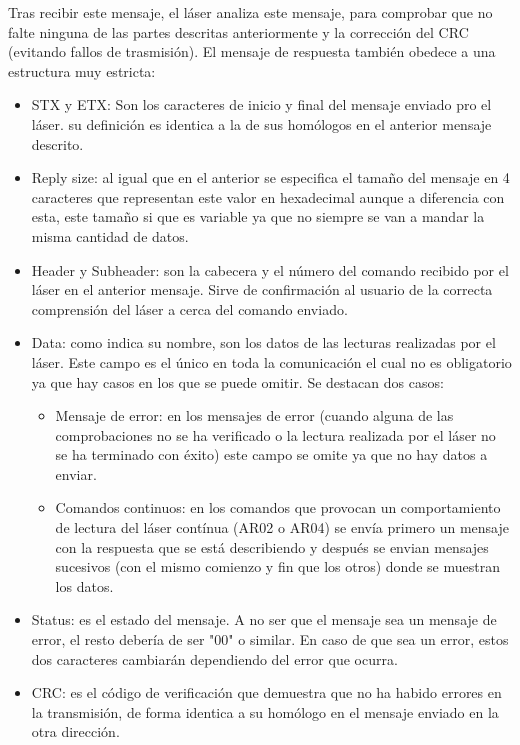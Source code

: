 Tras recibir este mensaje, el láser analiza este mensaje, para comprobar que no falte ninguna de las partes descritas anteriormente y la corrección del CRC (evitando fallos de trasmisión). El mensaje de respuesta también obedece a una estructura muy estricta:\\
\begin{itemize}
	\item STX y ETX: Son los caracteres de inicio y final del mensaje enviado pro el láser. su definición es identica a la de sus homólogos en el anterior mensaje descrito.
	\item Reply size: al igual que en el anterior se especifica el tamaño del mensaje en 4 caracteres que representan este valor en hexadecimal aunque a diferencia con esta, este tamaño si que es variable ya que no siempre se van a mandar la misma cantidad de datos.
	\item Header y Subheader: son la cabecera y el número del comando recibido por el láser en el anterior mensaje. Sirve de confirmación al usuario de la correcta comprensión del láser a cerca del comando enviado.
	\item Data: como indica su nombre, son los datos de las lecturas realizadas por el láser. Este campo es el único en toda la comunicación el cual no es obligatorio ya que hay casos en los que se puede omitir. Se destacan dos casos:
	\begin{itemize}
		\item Mensaje de error: en los mensajes de error (cuando alguna de las comprobaciones no se ha verificado o la lectura realizada por el láser no se ha terminado con éxito) este campo se omite ya que no hay datos a enviar.
		\item Comandos continuos: en los comandos que provocan un comportamiento de lectura del láser contínua (AR02 o AR04) se envía primero un mensaje con la respuesta que se está describiendo y después se envian mensajes sucesivos (con el mismo comienzo y fin que los otros) donde se muestran los datos.
	\end{itemize}
	\item Status: es el estado del mensaje. A no ser que el mensaje sea un mensaje de error, el resto debería de ser "00" o similar. En caso de que sea un error, estos dos caracteres cambiarán dependiendo del error que ocurra.
	\item CRC: es el código de verificación que demuestra que no ha habido errores en la transmisión, de forma identica a su homólogo en el mensaje enviado en la otra dirección.
\end{itemize}
